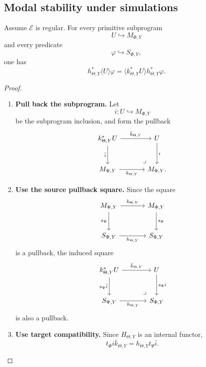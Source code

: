 \subsection{Modal stability under simulations}
\label{subsec:poly-relative-modal-stability-simulation}

\begin{proposition}
\label{prop:poly-relative-diamond-stability-simulation}
Assume \(\mathcal E\) is regular.  For every primitive subprogram
\[
U\hookrightarrow M_{\Phi,Y}
\]
and every predicate
\[
\varphi\hookrightarrow S_{\Phi,Y},
\]
one has
\[
h_{\Theta,Y}^\ast\langle U\rangle\varphi
=
\langle k_{\Theta,Y}^\ast U\rangle h_{\Theta,Y}^\ast\varphi.
\]
\end{proposition}

\begin{proof}
\leavevmode
\begin{enumerate}
\item \textbf{Pull back the subprogram.}
Let
\[
i:U\hookrightarrow M_{\Phi,Y}
\]
be the subprogram inclusion, and form the pullback
\[
\begin{tikzcd}[column sep=large,row sep=large]
k_{\Theta,Y}^\ast U
  \arrow[r,"\bar k_{\Theta,Y}"]
  \arrow[d,"\bar i"']
&
U
  \arrow[d,"i"]
\\
M_{\Psi,Y}
  \arrow[r,"k_{\Theta,Y}"']
&
M_{\Phi,Y}
\arrow[ul,phantom,very near start,"\lrcorner"] .
\end{tikzcd}
\]

\item \textbf{Use the source pullback square.}
Since the square
\[
\begin{tikzcd}[column sep=large,row sep=large]
M_{\Psi,Y} \arrow[r,"k_{\Theta,Y}"] \arrow[d,"s_\Psi"']
&
M_{\Phi,Y} \arrow[d,"s_\Phi"]
\\
S_{\Psi,Y} \arrow[r,"h_{\Theta,Y}"']
&
S_{\Phi,Y}
\end{tikzcd}
\]
is a pullback, the induced square
\[
\begin{tikzcd}[column sep=large,row sep=large]
k_{\Theta,Y}^\ast U
  \arrow[r,"\bar k_{\Theta,Y}"]
  \arrow[d,"s_\Psi\bar i"']
&
U
  \arrow[d,"s_\Phi i"]
\\
S_{\Psi,Y}
  \arrow[r,"h_{\Theta,Y}"']
&
S_{\Phi,Y}
\arrow[ul,phantom,very near start,"\lrcorner"]
\end{tikzcd}
\]
is also a pullback.

\item \textbf{Use target compatibility.}
Since \(H_{\Theta,Y}\) is an internal functor,
\[
t_\Phi i\bar k_{\Theta,Y}=h_{\Theta,Y}t_\Psi\bar i.
\]


\end{enumerate}
\end{proof}
